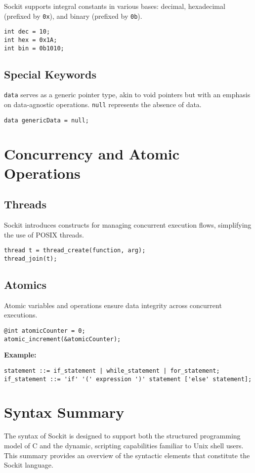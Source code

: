 \documentclass[12pt,a4paper]{article} %
\begin{document}
Sockit supports integral constants in various bases: decimal, hexadecimal (prefixed by \texttt{0x}), and binary (prefixed by \texttt{0b}).

\begin{verbatim}
int dec = 10;
int hex = 0x1A;
int bin = 0b1010;
\end{verbatim}

\subsection{Special Keywords}
\texttt{data} serves as a generic pointer type, akin to void pointers but with an emphasis on data-agnostic operations. \texttt{null} represents the absence of data.

\begin{verbatim}
data genericData = null;
\end{verbatim}

\section{Concurrency and Atomic Operations}
\subsection{Threads}
Sockit introduces constructs for managing concurrent execution flows, simplifying the use of POSIX threads.

\begin{verbatim}
thread t = thread_create(function, arg);
thread_join(t);
\end{verbatim}

\subsection{Atomics}
Atomic variables and operations ensure data integrity across concurrent executions.

\begin{verbatim}
@int atomicCounter = 0;
atomic_increment(&atomicCounter);
\end{verbatim}

\textbf{Example:}
\begin{verbatim}
statement ::= if_statement | while_statement | for_statement;
if_statement ::= 'if' '(' expression ')' statement ['else' statement];
\end{verbatim}
\section{Syntax Summary}
The syntax of Sockit is designed to support both the structured programming model of C and the dynamic, scripting capabilities familiar to Unix shell users. This summary provides an overview of the syntactic elements that constitute the Sockit language.
\end{document}
